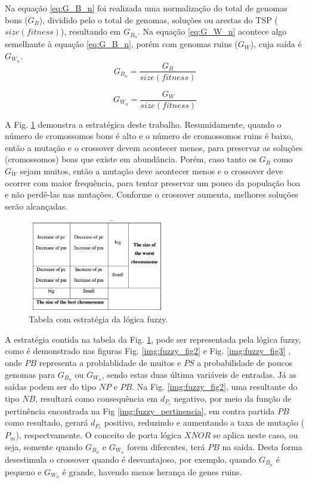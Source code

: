 \documentclass[conference]{IEEEtran}
\begin{document}
Na equação \ref{eq:G_B_n} foi realizada uma normalização do total de genomas bons ($G_B$), dividido pelo o total de genomas, soluções ou arestas do TSP ($size(fitness)$), resultando em $G_B_n$. Na equação \ref{eq:G_W_n} acontece algo semelhante à equação \ref{eq:G_B_n}, porém com genomas ruins ($G_W$), cuja saída é $G_W_n$.
\begin{equation}
\label{eq:G_B_n}
    G_B_n = \frac{G_B}{size(fitness)}
\end{equation} 

\begin{equation}
\label{eq:G_W_n}
    G_W_n = \frac{G_W}{size(fitness)}
\end{equation} 

A Fig. \ref{img:fuzzy_fig1} demonstra a estratégica deste trabalho. Resumidamente, quando o número de cromossomos bons é alto e o número de cromossomos ruins é baixo, então a mutação e o crossover devem acontecer menos, para preservar as soluções (cromossomos) boas que existe em abundância. Porém, caso tanto os $G_B$ como $G_W$ sejam muitos, então a mutação deve acontecer menos e o crossover deve ocorrer com maior frequência, para tentar preservar um pouco da população boa e não perdê-las nas mutações. Conforme o crossover aumenta, melhores soluções serão alcançadas. 
\begin{figure}[ht]
\centering
\includegraphics[width=6cm]{fuzzy_fig1.png}
\caption{\label{img:fuzzy_fig1}Tabela com estratégia da lógica fuzzy.} 
\end{figure}

A estratégia contida na tabela da Fig. \ref{img:fuzzy_fig1}, pode ser representada pela lógica fuzzy, como é demonstrado nas figuras Fig. \ref{img:fuzzy_fig2} e Fig. \ref{img:fuzzy_fig3} , onde $PB$ representa a problablidade de muitos e $PS$ a probabilidade de poucos genomas para $G_B_n$ ou  $G_W_n$, sendo estas duas última variáveis de entradas. Já as saídas podem ser do tipo $NP$ e $PB$. Na Fig. \ref{img:fuzzy_fig2}, uma resultante do tipo $NB$, resultará como consequência em $d_P_c$ negativo, por meio da função de pertinência encontrada na Fig \ref{img:fuzzy_pertinencia},  em contra partida $PB$ como resultado, gerará $d_P_c$ positivo, reduzindo e aumentando a taxa de mutação ($P_m$), respectvamente. O conceito de porta lógica $XNOR$ se aplica neste caso, ou seja, somente quando $G_B_n$ e $G_W_n$ forem diferentes, terá $PB$ na saída. Desta forma desestimula o crossover quando é desvantajoso, por exemplo, quando $G_B_n$ é pequeno e $G_W_n$ é grande, havendo menos herança de genes ruins.
\end{document}

